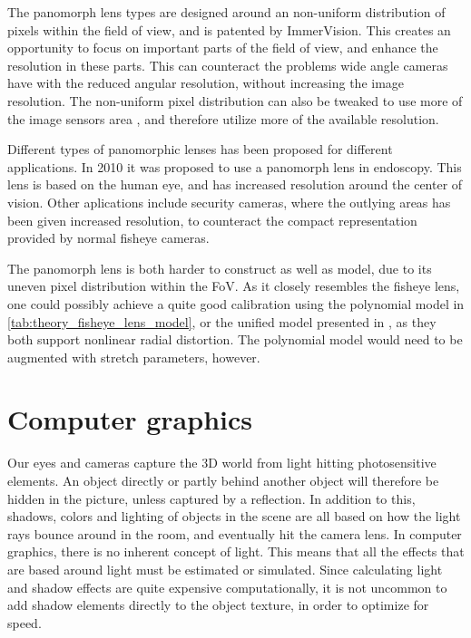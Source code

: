 The panomorph lens types are designed around an non-uniform distribution of pixels within the field of view, and is patented by ImmerVision. This creates an opportunity to focus on important parts of the field of view, and enhance the resolution in these parts. This can counteract the problems wide angle cameras have with the reduced angular resolution, without increasing the image resolution. The non-uniform pixel distribution can also be tweaked to use more of the image sensors area \cite{PanomorphLowCostSurvailance}, and therefore utilize more of the available resolution.

Different types of panomorphic lenses has been proposed for different applications. In 2010 it was proposed to use a panomorph lens in endoscopy\cite{endoscopypano}. This lens is based on the human eye, and has increased resolution around the center of vision. Other aplications include security cameras\cite{PanomorphEnhancesSurvailance}, where the outlying areas has been given increased resolution, to counteract the compact representation provided by normal fisheye cameras.

The panomorph lens is both harder to construct as well as model, due to its uneven pixel distribution within the FoV. As it closely resembles the fisheye lens, one could possibly achieve a quite good calibration using the polynomial model in \ref{tab:theory_fisheye_lens_model}, or the unified model presented in \cite{FisheyeKalibration}, as they both support nonlinear radial distortion. The polynomial model would need to be augmented with stretch parameters, however.

\section{Computer graphics}

Our eyes and cameras capture the 3D world from light hitting photosensitive elements. An object directly or partly behind another object will therefore be hidden in the picture, unless captured by a reflection. In addition to this, shadows, colors and lighting of objects in the scene are all based on how the light rays bounce around in the room, and eventually hit the camera lens. In computer graphics, there is no inherent concept of light. This means that all the effects that are based around light must be estimated or simulated. Since calculating light and shadow effects are quite expensive computationally, it is not uncommon to add shadow elements directly to the object texture, in order to optimize for speed.

